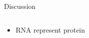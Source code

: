 \begin{frame}{Discussion}
\begin{columns}
\begin{column}{0.5\textwidth}
\begin{itemize}
\begin{itemize}
        \item RNA represent protein
    \end{itemize}
\end{itemize}
\end{column}
\begin{column}{0.5\textwidth}
\end{column}
\end{columns}
\end{frame}
